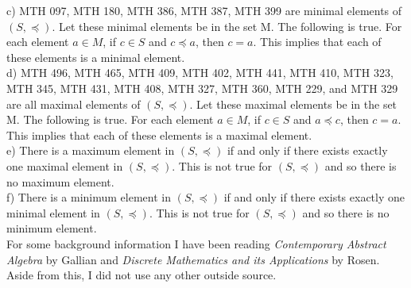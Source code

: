 \documentclass[12pt]{article}
\begin{document}
\noindent c) MTH 097, MTH 180, MTH 386, MTH 387, MTH 399 are minimal elements of $(S,\preccurlyeq)$. Let these minimal elements be in the set M. The following is true. For each element $a\in M$, if $c \in S$ and $c \preccurlyeq a$, then $c = a$.  This implies that each of these elements is a minimal element.\\

\noindent d) MTH 496, MTH 465, MTH 409, MTH 402, MTH 441, MTH 410, MTH 323, MTH 345, MTH 431, MTH 408, MTH 327, MTH 360, MTH 229, and MTH 329 are all maximal elements of $(S, \preccurlyeq)$. Let these maximal elements be in the set M. The following is true. For each element $a\in M$, if $c \in S$ and $a \preccurlyeq c$, then $c = a$.  This implies that each of these elements is a maximal element.\\

\noindent e) There is a maximum element in $(S,\preccurlyeq)$ if and only if there exists exactly one maximal element in $(S,\preccurlyeq)$. This is not true for $(S,\preccurlyeq)$ and so there is no maximum element.\\

\noindent f) There is a minimum element in $(S,\preccurlyeq)$ if and only if there exists exactly one minimal element in $(S,\preccurlyeq)$. This is not true for $(S,\preccurlyeq)$ and so there is no minimum element.\\


For some background information I have been reading {\it Contemporary Abstract Algebra} by Gallian and {\it Discrete Mathematics and its Applications} by Rosen. Aside from this, I did not use any other outside source.
\end{document}

